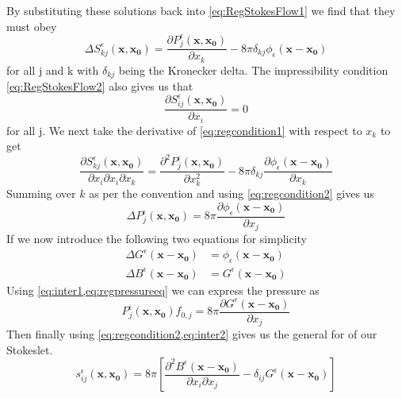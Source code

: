 By substituting these solutions back into \cref{eq:RegStokesFlow1} we find that they must obey
\begin{equation}
\label{eq:regcondition1}
    \Delta S^\epsilon_{kj}(\mathbf{x},\mathbf{x_0}) = \frac{\partial P^\epsilon_{j}(\mathbf{x},\mathbf{x_0})}{\partial x_k} - 8\pi\delta_{kj}\phi_\epsilon(\mathbf{x}-\mathbf{x_0})
\end{equation}
for all j and k with $\delta_{kj}$ being the Kronecker delta. The impressibility condition \cref{eq:RegStokesFlow2} also gives us that
\begin{equation}
\label{eq:regcondition2}
    \frac{\partial S^\epsilon_{ij}(\mathbf{x},\mathbf{x_0})}{\partial x_i} = 0
\end{equation}
for all j. We next take the derivative of \cref{eq:regcondition1} with respect to $x_k$ to get 
\begin{equation*}
    \frac{\partial S^\epsilon_{kj}(\mathbf{x},\mathbf{x_0})}{\partial x_i \partial x_i \partial x_k} = \frac{\partial^2 P^\epsilon_{j}(\mathbf{x},\mathbf{x_0})}{\partial x_k^2} - 8\pi\delta_{kj}\frac{\partial \phi_\epsilon(\mathbf{x}-\mathbf{x_0})}{\partial x_k}
\end{equation*}
Summing over $k$ as per the convention and using \cref{eq:regcondition2} gives us 
\begin{equation}
\label{eq:regpressureeq}
    \Delta P^\epsilon_{j}(\mathbf{x},\mathbf{x_0}) = 8\pi\frac{\partial \phi_\epsilon(\mathbf{x}-\mathbf{x_0})}{\partial x_j}
\end{equation}
If we now introduce the following two equations for simplicity
\begin{subequations}
\label{eq:intermediate}
\begin{align}
    \Delta G^\epsilon(\mathbf{x}-\mathbf{x_0})  &= \phi_\epsilon(\mathbf{x}-\mathbf{x_0}) \label{eq:inter1} \\
    \Delta B^\epsilon(\mathbf{x}-\mathbf{x_0})  &= G^\epsilon(\mathbf{x}-\mathbf{x_0}) \label{eq:inter2}
\end{align}
\end{subequations}
Using \cref{eq:inter1,eq:regpressureeq} we can express the pressure as 
\begin{equation}
\label{eq:pressuresol}
    P^\epsilon_{j}(\mathbf{x},\mathbf{x_0})f_{0,j} = 8 \pi \frac{\partial G^\epsilon(\mathbf{x}-\mathbf{x_0})}{\partial x_j}
\end{equation}
Then finally using \cref{eq:regcondition2,eq:inter2} gives us the general for of our Stokeslet.
\begin{equation}
\label{eq:regstokeslet1}
    s_{ij}^\epsilon(\mathbf{x}, \mathbf{x_0}) = 8\pi\left[ \frac{\partial^2 B^\epsilon(\mathbf{x} -\mathbf{x_0})}{\partial x_i \partial x_j} - \delta_{ij}  G^\epsilon(\mathbf{x} -\mathbf{x_0})\right]
\end{equation}

